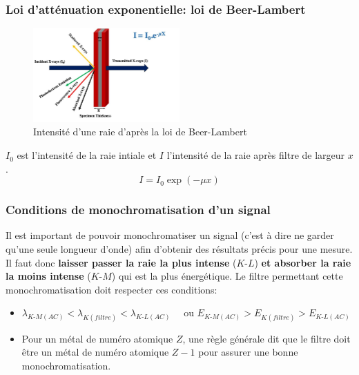 \documentclass{article}
\begin{document}
\subsubsection{Loi d'atténuation exponentielle: loi de Beer-Lambert}

\setlength{\intextsep}{0pt}
\begin{figure} %
    \centering
    \includegraphics[width=0.5\textwidth]{Fig/Beer-Lambert-law-X-rays-to-solid-matter-interaction.png} 
    \caption{Intensité d'une raie d'après la loi de Beer-Lambert}
    \label{fig:Beer Lambert}
\end{figure}


$I_0$ est l'intensité de la raie intiale et $I$ l'intensité de la raie après filtre de largeur $x$.
\vspace{1cm}
{\Large$$I=I_0 \exp{(-\mu x)}$$} 

\vspace{3.5cm}

\subsubsection{Conditions de monochromatisation d'un signal}

Il est important de pouvoir monochromatiser un signal (c'est à dire ne garder qu'une seule longueur d'onde) afin d'obtenir des résultats précis pour une mesure. 
Il faut donc \textbf{laisser passer la raie la plus intense} ($K\text{-}L$) \textbf{et absorber la raie la moins intense} ($K\text{-}M$) qui est la plus énergétique.
Le filtre permettant cette monochromatisation doit respecter ces conditions:
\begin{itemize}[label=$\ast$]
    \item  $\lambda_{K\text{-}M (AC)} < \lambda_{K (filtre)} < \lambda_{K\text{-}L (AC)} \quad$ ou $E_{K\text{-}M (AC)} > E_{K (filtre)} > E_{K\text{-}L (AC)}$
    \item Pour un métal de numéro atomique $Z$, une règle générale dit que le filtre doit être un métal de numéro atomique $Z-1$ pour assurer une bonne monochromatisation.
\end{itemize}
\end{document}
